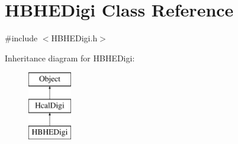 \hypertarget{class_h_b_h_e_digi}{}\section{H\+B\+H\+E\+Digi Class Reference}
\label{class_h_b_h_e_digi}


{\ttfamily \#include $<$H\+B\+H\+E\+Digi.\+h$>$}

Inheritance diagram for H\+B\+H\+E\+Digi\+:\begin{figure}[H]
\begin{center}
\leavevmode
\includegraphics[height=3.000000cm]{class_h_b_h_e_digi}
\end{center}
\end{figure}
